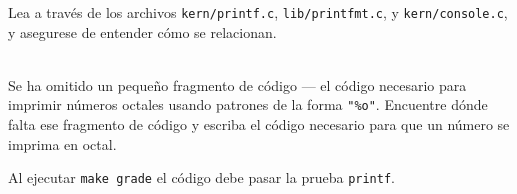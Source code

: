 \documentclass{article}
\begin{document}
Lea a trav\'es de los archivos {\tt kern/printf.c}, {\tt lib/printfmt.c}, y 
{\tt kern/console.c}, y asegurese de entender c\'omo se relacionan. 

\\
Se ha omitido un peque\~no fragmento de c\'odigo --- el c\'odigo necesario 
para imprimir n\'umeros octales usando patrones de la forma {\tt "\%o"}. 
Encuentre d\'onde falta ese fragmento de c\'odigo y escriba el c\'odigo 
necesario para que un n\'umero se imprima en octal.

Al ejecutar {\tt make grade} el c\'odigo debe pasar la prueba {\tt printf}.
\end{document}
